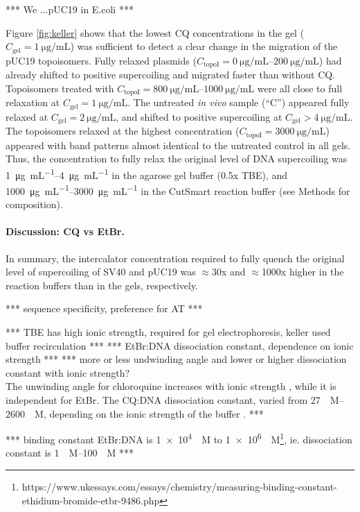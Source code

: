 \documentclass[10pt,a4]{article}
\newcommand{\ugml}{\micro\gram\per\milli\liter}
\newcommand{\M}{\textsc{M}}%
\newcommand{\uM}{\micro\textsc{M}}%
\newcommand{\cqgel}{\ensuremath{C_{\text{gel}}}}
\newcommand{\cqtop}{\ensuremath{C_{\text{topoI}}}}
\newcommand{\TODO}[1]{\begingroup\color{red}*** #1 ***\endgroup}
\begin{document}
\TODO{We ...pUC19 in E.coli}

Figure \ref{fig:keller} shows that the lowest CQ concentrations in the
gel ($\cqgel=\SI{1}{\ugml}$) was sufficient to detect a clear change
in the migration of the pUC19 topoisomers. Fully relaxed plasmids
($\cqtop=\SIrange{0}{200}{\ugml}$) had already shifted to positive
supercoiling and migrated faster than without CQ.  Topoisomers treated
with $\cqtop=\SIrange{800}{1000}{\ugml}$ were all close to full
relaxation at $\cqgel=\SI{1}{\ugml}$. The untreated \textit{in vivo}
sample (``C'') appeared fully relaxed at $\cqgel=\SI{2}{\ugml}$, and
shifted to positive supercoiling at $\cqgel>\SI{4}{\ugml}$.  The
topoisomers relaxed at the highest concentration
($\cqtop=\SI{3000}{\ugml}$) appeared with band patterns almost
identical to the untreated control in all gels.
%
Thus, the concentration to fully relax the original level of DNA
supercoiling was \SIrange{1}{4}{\ugml} in the agarose gel buffer (0.5x
TBE), and \SIrange{1000}{3000}{\ugml} in the CutSmart reaction buffer
(see Methods for composition).
%

\paragraph{Discussion: CQ vs EtBr.}
In summary, the intercalator concentration required to fully quench
the original level of supercoiling of SV40 and pUC19 was $\approx$30x and
$\approx$1000x higher in the reaction buffers than in the gels,
respectively.

\TODO{sequence specificity, preference for AT}


\TODO{TBE has high ionic strength, required for gel electrophoresis,
keller used buffer recirculation}
\TODO{EtBr:DNA dissociation constant, dependence on ionic strength}
\TODO{more or less undwinding angle and lower or higher dissociation
  constant with ionic strength?\\ The unwinding angle for chloroquine
  increases with ionic strength \cite{Jones1980}, while it is
  independent for EtBr. The CQ:DNA dissociation constant, varied from
  \SIrange{27}{2600}{\uM}, depending on the ionic strength of the
  buffer \cite{KwakyeBerko1989}.}

\TODO{binding constant EtBr:DNA is \SI{1e4}{\per\M} to
  \SI{1e6}{\per\M}\footnote{https://www.ukessays.com/essays/chemistry/measuring-binding-constant-ethidium-bromide-etbr-9486.php},
  ie. dissociation constant is \SIrange{1}{100}{\uM}}
\end{document}
